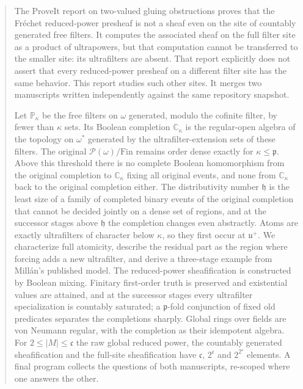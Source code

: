 \documentclass[11pt,letterpaper]{article}
\theoremstyle{definition}
\theoremstyle{remark}
\newcommand{\om}{\omega}
\newcommand{\Fin}{\mathrm{Fin}}
\newcommand{\C}{\mathbb C}
\newcommand{\PP}{\mathbb P}
\newcommand{\pow}{\mathcal P}
\newcommand{\cp}{\mathfrak p}
\newcommand{\cu}{\mathfrak u}
\newcommand{\cc}{\mathfrak c}
\newcommand{\ch}{\mathfrak h}
\begin{document}
\begin{abstract}
The ProveIt report on two-valued gluing obstructions proves that the
Fr\'echet reduced-power presheaf is not a sheaf even on the site of
countably generated free filters. It computes the associated sheaf on the
full filter site as a product of ultrapowers, but that computation cannot
be transferred to the smaller site: its ultrafilters are absent. That
report explicitly does not assert that every reduced-power presheaf on a
different filter site has the same behavior. This report studies such
other sites. It merges two manuscripts written independently
against the same repository snapshot.

Let $\PP_\kappa$ be the free filters on $\om$ generated, modulo the
cofinite filter, by fewer than $\kappa$ sets. Its Boolean completion
$\C_\kappa$ is the regular-open algebra of the topology on $\om^*$
generated by the ultrafilter-extension sets of these filters. The
original $\pow(\om)/\Fin$ remains order dense exactly for
$\kappa\leq\cp$. Above this threshold there is no complete Boolean
homomorphism from the original completion to $\C_\kappa$ fixing all
original events, and none from $\C_\kappa$ back to the original
completion either. The distributivity number $\ch$ is the least size of
a family of completed binary events of the original completion that
cannot be decided jointly on a dense set of regions, and at the
successor stages above $\ch$ the completion changes even abstractly.
Atoms are exactly ultrafilters of character below $\kappa$, so they
first occur at $\cu^+$. We characterize full atomicity, describe the
residual part as the region where forcing adds a new ultrafilter, and
derive a three-stage example from Mill\'an's published model. The
reduced-power sheafification is constructed by Boolean mixing.
Finitary first-order truth is preserved and existential values are
attained, and at the successor stages every ultrafilter specialization
is countably saturated; a $\cp$-fold conjunction of fixed old predicates
separates the completions sharply. Global rings over fields are von
Neumann regular, with the completion as their idempotent algebra. For
$2\leq|M|\leq\cc$ the raw global reduced power, the countably generated
sheafification and the full-site sheafification have $\cc$, $2^\cc$ and
$2^{2^\cc}$ elements. A final program collects the questions of both
manuscripts, re-scoped where one answers the other.
\end{abstract}

\tableofcontents
\newpage
\end{document}
